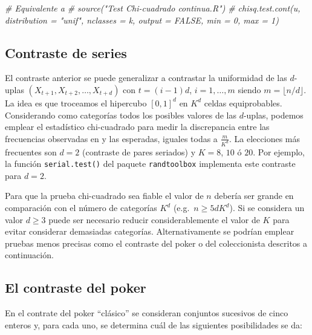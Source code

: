 \documentclass[
]{book}
\newenvironment{Shaded}{\begin{snugshade}}{\end{snugshade}}
\newcommand{\CommentTok}[1]{\textcolor[rgb]{0.56,0.35,0.01}{\textit{#1}}}
\theoremstyle{break}
\theoremstyle{definition}
\theoremstyle{definition}
\theoremstyle{definition}
\theoremstyle{remark}
\begin{document}
\begin{Shaded}
\begin{Highlighting}[]
\CommentTok{# Equivalente a}
\CommentTok{# source("Test Chi-cuadrado continua.R")  }
\CommentTok{# chisq.test.cont(u, distribution = "unif", nclasses = k, output = FALSE, min = 0, max = 1)}
\end{Highlighting}
\end{Shaded}

\hypertarget{contraste-de-series}{%
\subsection{Contraste de series}\label{contraste-de-series}}

El contraste anterior se puede generalizar a contrastar la uniformidad de las \(d\)-uplas \((X_{t+1},X_{t+2},\ldots,X_{t+d})\) con \(t=(i-1)d\), \(i=1,\ldots,m\) siendo \(m=\lfloor n/d \rfloor\).
La idea es que troceamos el hipercubo \([0, 1]^d\) en \(K^d\) celdas equiprobables.
Considerando como categorías todos los posibles valores de las \(d\)-uplas, podemos emplear el estadístico chi-cuadrado para medir la discrepancia entre las frecuencias observadas en y las esperadas, iguales todas a \(\frac{m}{K^d}\). La elecciones más frecuentes son \(d=2\) (contraste de pares seriados) y \(K=8\), \(10\) ó \(20\).
Por ejemplo, la función \texttt{serial.test()} del paquete \texttt{randtoolbox} implementa este contraste para \(d=2\).

Para que la prueba chi-cuadrado sea fiable el valor de \(n\) debería ser grande en comparación con el número de categorías \(K^d\) (e.g.~\(n \geq 5dK^d\)). Si se considera un valor \(d \geq 3\) puede ser necesario reducir considerablemente el valor de \(K\) para evitar considerar demasiadas categorías. Alternativamente se podrían emplear pruebas menos precisas como el contraste del poker o del coleccionista descritos a continuación.

\hypertarget{el-contraste-del-poker}{%
\subsection{El contraste del poker}\label{el-contraste-del-poker}}

En el contrate del poker ``clásico'' se consideran conjuntos sucesivos de cinco enteros y, para cada uno, se determina cuál de las siguientes posibilidades se da:
\end{document}
